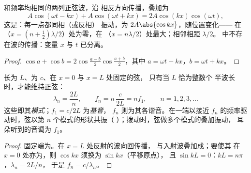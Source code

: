 \begin{theorem}[驻波]\label{thm:b1:wave-propagation:standing}
和频率均相同的两列正弦波，沿
相反方向传播，叠加为
\[
A\cos(\omega t - kx) + A\cos(\omega t + kx) = 2A\cos(kx)\cos(\omega t),
\]
这是\emph{}：每一点都同相（或反相）
振动，为 $2A\abs{\cos kx}$，随位置变化——
在\emph{}（$x = (n + \tfrac12)\lambda/2$）处为零，在
\emph{}（$x = n\lambda/2$）处最大；相邻相距 $\lambda/2$。
中不存在波的传播：变量 $x$ 与 $t$ 已分离。
\end{theorem}

\begin{proof}
$\cos a + \cos b = 2\cos\frac{a - b}{2}\cos\frac{a + b}{2}$，其中
$a = \omega t - kx$，$b = \omega t + kx$。
\end{proof}

\begin{proposition}[两端固定弦的模式]\label{prop:b1:wave-propagation:modes}
长为 $L$、为 $c$、在 $x = 0$ 与 $x = L$ 处固定的弦，
只有当 $L$ 恰为整数个
半波长时，才能维持正弦：
\[
\lambda_n = \frac{2L}{n}, \qquad f_n = n\,\frac{c}{2L} = n f_1,
\qquad n = 1, 2, 3, \dots
\]
这些即其\emph{模式}；$f_1 = c/2L$ 为\emph{基音}，
$f_n$ 则为其各谐音。在一端以接近
$f_n$ 的频率驱动时，弦以第 $n$ 个模式的形状共振（
）；拨动时，弦做多个模式的叠加振动，
耳朵听到的音调为 $f_1$。
\end{proposition}

\begin{proof}
固定端为。在 $x = L$ 处反射的波向回传播，
与入射波叠加成；要使其
在 $x = 0$ 处亦为，则 $\cos kx$ 须换为 $\sin kx$（平移原点），
且 $\sin kL = 0$：$kL = n\pi$，$\lambda_n = 2L/n$，
于是 $f_n = c/\lambda_n$。
\end{proof}

